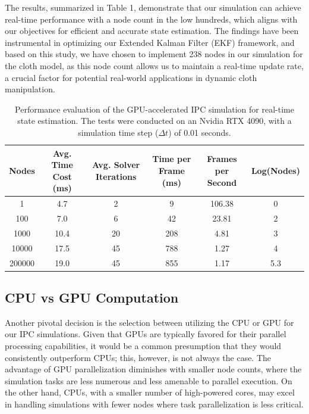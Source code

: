 \documentclass[subscriptcorrection,upint,varvw,barcolor=Goldenrod3,mathalfa=cal=euler,balance,hyphenate,french,pdf-a, nofoot]{asmejour} %
\begin{document}
The results, summarized in Table 1, demonstrate that our simulation can achieve real-time performance with a node count in the low hundreds, which aligns with our objectives for efficient and accurate state estimation. The findings have been instrumental in optimizing our Extended Kalman Filter (EKF) framework, and based on this study, we have chosen to implement 238 nodes in our simulation for the cloth model, as this node count allows us to maintain a real-time update rate, a crucial factor for potential real-world applications in dynamic cloth manipulation.
\begin{table}[!htbp]
\centering
\caption{Performance evaluation of the GPU-accelerated IPC simulation for real-time state estimation. The tests were conducted on an Nvidia RTX 4090, with a simulation time step (\(\Delta t\)) of 0.01 seconds.}
\label{tab:gpu_performance}
\begin{tabular}{|c|c|c|c|c|c|}
\hline
\textbf{Nodes} & \textbf{Avg. Time Cost (ms)} & \textbf{Avg. Solver Iterations} & \textbf{Time per Frame (ms)} & \textbf{Frames per Second} & \textbf{Log(Nodes)} \\ \hline
1       & 4.7   & 2  & 9     & 106.38 & 0 \\ \hline
100     & 7.0   & 6  & 42    & 23.81  & 2 \\ \hline
1000    & 10.4  & 20 & 208   & 4.81   & 3 \\ \hline
10000   & 17.5  & 45 & 788   & 1.27   & 4 \\ \hline
200000  & 19.0  & 45 & 855   & 1.17   & 5.3 \\ \hline
\end{tabular}
\end{table}

\subsection{CPU vs GPU Computation}

 Another pivotal decision is the selection between utilizing the CPU or GPU for our IPC simulations. Given that GPUs are typically favored for their parallel processing capabilities, it would be a common presumption that they would consistently outperform CPUs; this, however, is not always the case. The advantage of GPU parallelization diminishes with smaller node counts, where the simulation tasks are less numerous and less amenable to parallel execution. On the other hand, CPUs, with a smaller number of high-powered cores, may excel in handling simulations with fewer nodes where task parallelization is less critical.
\end{document}
